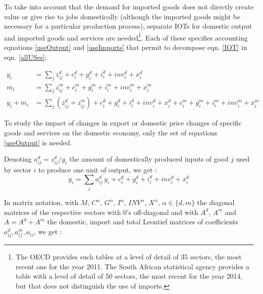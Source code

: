 \documentclass[12pt,english]{article}
\begin{document}
To take into account that the demand for imported goods does not directly create value or give rise to jobs domestically (although the imported goods might be necessary for a particular production process), separate IOTs for domestic output and imported goods and services are needed\footnote{The OECD provides such tables at a level of detail of 35 sectors, the most recent one for the year 2011. The South African statistical agency provides a table with a level of detail of 50 sectors, the most recent for the year 2014, but that does not distinguish the use of imports.}. Each of these specifies accounting equations \ref{useOutput} and \ref{useImports} that permit to decompose eqn. \ref{IOT} in eqn. \ref{allUSes}:

\begin{align}
y_i &= \sum_j z_{ij}^d + c_i^d + g_i^d + i_i^d + inv_i^d + x_i^d \label{useOutput} \\
m_i &= \sum_j z_{ij}^m + c_i^m + g_i^m + i_i^m + inv_i^m + x_i^m \label{useImports} \\
y_i + m_i &= \sum_j (z_{ij}^d + z_{ij}^m) + c^d_i + g_i^d + i_i^d + inv_i^d + x_i^d +  c_i^m + g_i^m + i_i^m + inv_i^m + x_i^m \label{allUSes}
\end{align}

To study the impact of changes in export or domestic price changes of specific goods and services on the domestic economy, only the set of equations \ref{useOutput} is needed.

Denoting %
$a_{ij}^d=z_{ij}^d/y_i$ the amount of domestically produced inputs of good $j$ used by sector $i$ to produce one unit of output, %
we get :
\begin{equation}
y_i = \sum_j a_{ij}^d \, y_i + c^d_i + g_i^d + i_i^d + inv_i^d + x_i^d
\end{equation}


In matrix notation, with $M$, $C^\alpha$, $G^\alpha$, $I^\alpha$, $INV^\alpha$, $X^\alpha$, $\alpha \in \{d,m\}$ the diagonal matrices of the respective vectors %
with 0's off-diagonal and with $A^d$, $A^m$ and $A=A^d+A^m$ the domestic, import and total Leontief matrices of coefficients $a_{ij}^d, a_{ij}^m, a_{ij}$, we get :

\end{document}
